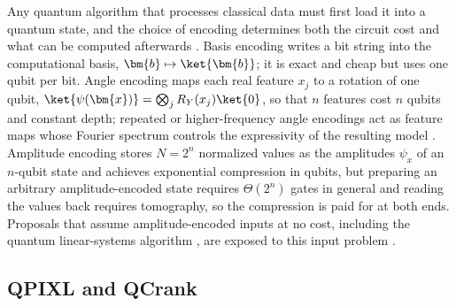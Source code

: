 Any quantum algorithm that processes classical data must first load it into a quantum state, and the choice of encoding determines both the circuit cost and what can be computed afterwards \cite{schuld2021dataencoding,larose2020encodings}. Basis encoding writes a bit string into the computational basis, $\bm{b}\mapsto\ket{\bm{b}}$; it is exact and cheap but uses one qubit per bit. Angle encoding maps each real feature $x_j$ to a rotation of one qubit, $\ket{\psi(\bm{x})}=\bigotimes_j R_Y(x_j)\ket{0}$, so that $n$ features cost $n$ qubits and constant depth; repeated or higher-frequency angle encodings act as feature maps whose Fourier spectrum controls the expressivity of the resulting model \cite{schuld2021dataencoding,havlicek2019featurespaces}. Amplitude encoding stores $N=2^n$ normalized values as the amplitudes $\psi_x$ of an $n$-qubit state and achieves exponential compression in qubits, but preparing an arbitrary amplitude-encoded state requires $\Theta(2^n)$ gates in general and reading the values back requires tomography, so the compression is paid for at both ends. Proposals that assume amplitude-encoded inputs at no cost, including the quantum linear-systems algorithm \cite{harrow2009hhl}, are exposed to this input problem \cite{biamonte2017qml}.

\subsection{QPIXL and QCrank}

